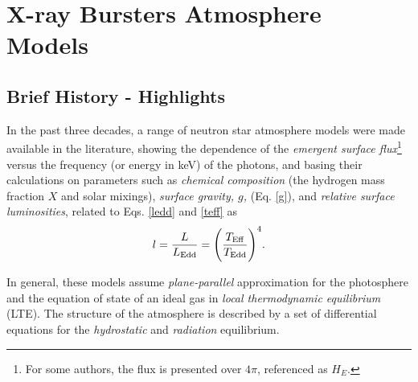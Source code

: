 {%















\section{X-ray Bursters Atmosphere Models}


\subsection{Brief History - Highlights}

In the past three decades, a range of neutron star atmosphere models were made available in the literature, showing the dependence of the {\it emergent  surface flux}\footnote{For some authors, the  flux is presented over $4\pi$, referenced as $H_E$.}  versus the frequency (or energy in keV) of the photons, and  basing their calculations on parameters such as {\it chemical composition} (\eg the hydrogen mass fraction $X$ and solar mixings), {\it surface gravity, $g$,} (Eq. \ref{g}), and  {\it relative surface luminosities}, related to Eqs. \ref{ledd} and \ref{teff} as
\begin{equation}
l=\frac{L}{L_{\rm Edd}} = \Bigg(\frac{T_{\rm Eff}}{T_{\rm Edd}}\Bigg)^4.
\label{ll}
\end{equation}

\quad

  In general, these models assume {\it plane-parallel} approximation for the photosphere and the equation of state of an ideal gas in {\it local thermodynamic equilibrium} (LTE). The structure of the atmosphere is described by a set of differential equations for the {\it hydrostatic} and {\it radiation} equilibrium.

}
